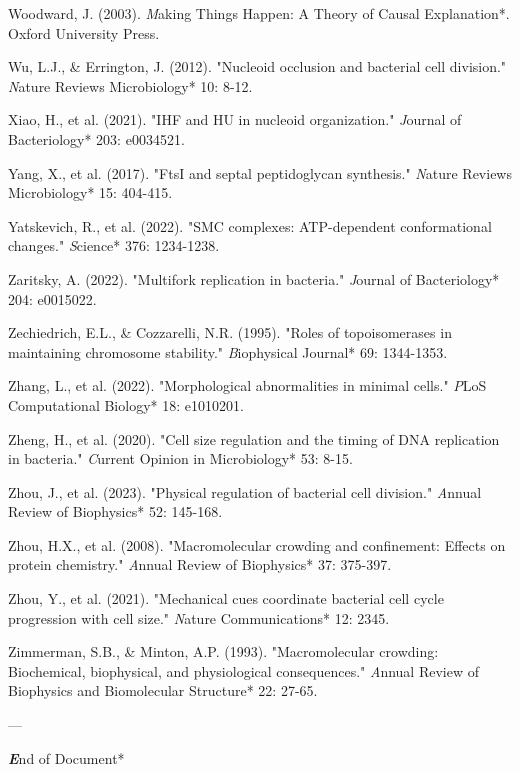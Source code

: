 \documentclass[11pt,a4paper]{article}
\begin{document}
Woodward, J. (2003). \textit*Making Things Happen: A Theory of Causal Explanation*. Oxford University Press.

Wu, L.J., & Errington, J. (2012). "Nucleoid occlusion and bacterial cell division." \textit*Nature Reviews Microbiology* 10: 8-12.

Xiao, H., et al. (2021). "IHF and HU in nucleoid organization." \textit*Journal of Bacteriology* 203: e0034521.

Yang, X., et al. (2017). "FtsI and septal peptidoglycan synthesis." \textit*Nature Reviews Microbiology* 15: 404-415.

Yatskevich, R., et al. (2022). "SMC complexes: ATP-dependent conformational changes." \textit*Science* 376: 1234-1238.

Zaritsky, A. (2022). "Multifork replication in bacteria." \textit*Journal of Bacteriology* 204: e0015022.

Zechiedrich, E.L., & Cozzarelli, N.R. (1995). "Roles of topoisomerases in maintaining chromosome stability." \textit*Biophysical Journal* 69: 1344-1353.

Zhang, L., et al. (2022). "Morphological abnormalities in minimal cells." \textit*PLoS Computational Biology* 18: e1010201.

Zheng, H., et al. (2020). "Cell size regulation and the timing of DNA replication in bacteria." \textit*Current Opinion in Microbiology* 53: 8-15.

Zhou, J., et al. (2023). "Physical regulation of bacterial cell division." \textit*Annual Review of Biophysics* 52: 145-168.

Zhou, H.X., et al. (2008). "Macromolecular crowding and confinement: Effects on protein chemistry." \textit*Annual Review of Biophysics* 37: 375-397.

Zhou, Y., et al. (2021). "Mechanical cues coordinate bacterial cell cycle progression with cell size." \textit*Nature Communications* 12: 2345.

Zimmerman, S.B., & Minton, A.P. (1993). "Macromolecular crowding: Biochemical, biophysical, and physiological consequences." \textit*Annual Review of Biophysics and Biomolecular Structure* 22: 27-65.

---

\textbf\textit*End of Document*
\end{document}
